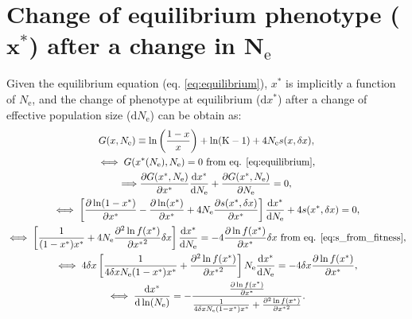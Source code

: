 \documentclass{article}
\newcommand{\der}{\mathrm{d}}
\newcommand{\Ne}{N_{\mathrm{e}}}
\newcommand{\dnds}{\omega}
\newcommand{\Nstate}{\text{K}}
\newcommand{\x}{x}
\newcommand{\eq}{^{*}}
\newcommand{\dx}{\delta \x}
\begin{document}
\begin{center}
\end{center}

\section*{Change of equilibrium phenotype ($\bm{\x\eq}$) after a change in $\bm{\Ne}$}
Given the equilibrium equation (eq. \ref{eq:equilibrium}), $\x\eq$ is implicitly a function of $\Ne$, and the change of phenotype at equilibrium ($\der \x\eq$) after a change of effective population size ($\der \Ne$) can be obtain as:
\begin{gather}
G(\x, \Ne ) \equiv \ln \left( \frac{1 - \x}{\x} \right) + \ln (\Nstate-1) + 4 \Ne s(\x, \dx), \\
\iff G(\x\eq(\Ne), \Ne ) = 0 \text{ from eq. \ref{eq:equilibrium}}, \\
\Longrightarrow \frac{\partial G(\x\eq, \Ne ) }{\partial \x\eq }\frac{ \der \x\eq}{\der \Ne} + \frac{ \partial G(\x\eq, \Ne )}{\partial \Ne} = 0, \\
\iff \left[ \frac{\partial \ln (1-\x\eq) }{\partial \x\eq } - \frac{\partial \ln (\x\eq) }{\partial \x\eq}  + 4 \Ne \frac{ \partial s(\x\eq, \dx) }{\partial \x\eq } \right]\frac{ \der \x\eq}{\der \Ne} + 4 s(\x\eq, \dx) = 0, \\
\iff \left[ \frac{1}{(1 - \x\eq) \x\eq} + 4 \Ne \frac{ \partial^2 \ln f(\x\eq) }{\partial {\x\eq}^2}\dx \right]\frac{ \der \x\eq}{\der \Ne}  = - 4 \frac{ \partial \ln f(\x\eq) }{\partial {\x\eq}}\dx \text{ from eq. \ref{eq:s_from_fitness}}, \\
\iff 4 \dx \left[ \frac{1}{4 \dx \Ne  (1 - \x\eq) \x\eq} + \frac{ \partial^2 \ln f(\x\eq) }{\partial {\x\eq}^2} \right] \Ne \frac{ \der \x\eq}{\der \Ne}  = - 4 \dx \frac{ \partial \ln f(\x\eq) }{\partial {\x\eq}}, \\
\iff \frac{ \der \x\eq}{\der \ln (\Ne)}  = - \frac{\frac{ \partial \ln f(\x\eq) }{\partial {\x\eq}}}{\frac{1}{4 \dx \Ne  (1 - \x\eq) \x\eq} + \frac{ \partial^2 \ln f(\x\eq) }{\partial {\x\eq}^2}}  \label{eq:dx_dlnNe}.
\end{gather}
\end{document}
